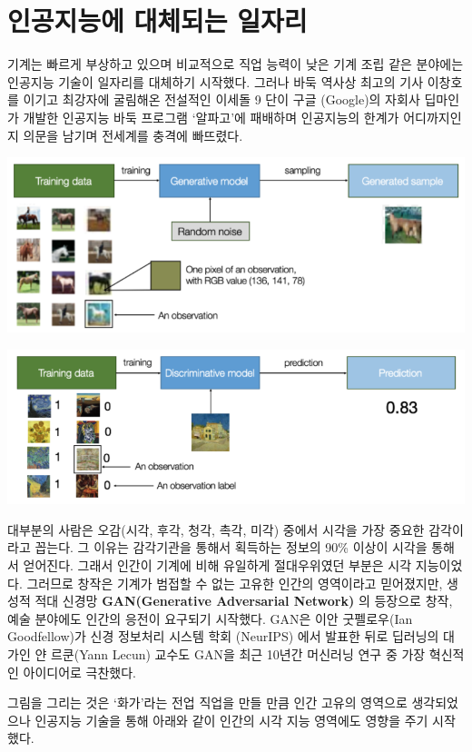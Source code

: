 \documentclass[smallextended]{svjour3}       %
\begin{document}
\hypertarget{challenge-to-human}{%
\section{인공지능에 대체되는 일자리}\label{challenge-to-human}}

기계\cite{brynjolfsson2014second, ford2015rise, kaplan2015humans, chang_2017}는
빠르게 부상하고 있으며 비교적으로 직업 능력이 낮은 기계 조립 같은
분야에는 인공지능 기술이 일자리를 대체하기 시작했다. 그러나 바둑 역사상
최고의 기사 이창호를 이기고 최강자에 굴림해온 전설적인 이세돌 9 단이
구글 (Google)의 자회사 딥마인가 개발한 인공지능 바둑 프로그램 `알파고'에
패배하며 인공지능의 한계가 어디까지인지 의문을 남기며 전세계를 충격에
빠뜨렸다.

\begin{center}\includegraphics[width=0.49\linewidth]{fig/generative-model} \end{center}

\begin{center}\includegraphics[width=0.49\linewidth]{fig/discriminative-model} \end{center}

대부분의 사람은 오감(시각, 후각, 청각, 촉각, 미각) 중에서 시각을 가장
중요한 감각이라고 꼽는다. 그 이유는 감각기관을 통해서 획득하는 정보의
90\% 이상이 시각을 통해서 얻어진다. 그래서 인간이 기계에 비해 유일하게
절대우위였던 부분은 시각 지능이었다. 그러므로 창작은 기계가 범접할 수
없는 고유한 인간의 영역이라고 믿어졌지만, 생성적 적대 신경망
\textbf{GAN(Generative Adversarial Network)}
\cite{brownlee_2019, hui_2018}의 등장으로 창작, 예술 분야에도 인간의
응전이 요구되기 시작했다. GAN은 이안 굿펠로우(Ian Goodfellow)가 신경
정보처리 시스템 학회 (NeurIPS) 에서 발표한 뒤로 딥러닝의 대가인 얀
르쿤(Yann Lecun) 교수도 GAN을 최근 10년간 머신러닝 연구 중 가장 혁신적인
아이디어로 극찬했다.

그림을 그리는 것은 `화가'라는 전업 직업을 만들 만큼 인간 고유의 영역으로
생각되었으나 인공지능 기술을 통해 아래와 같이 인간의 시각 지능 영역에도
영향을 주기 시작했다.
\end{document}
